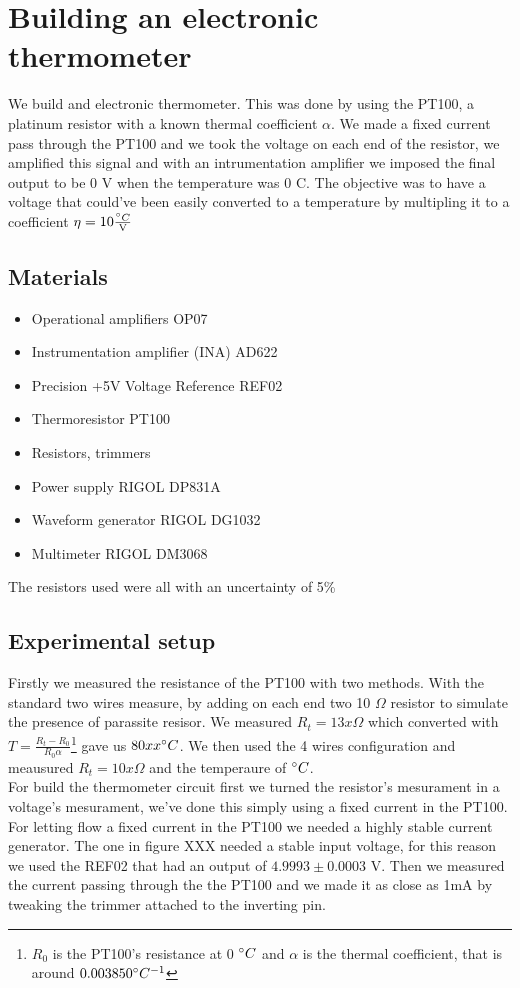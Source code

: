 \chapter{Building an electronic thermometer}
We build and electronic thermometer. This was done by using the PT100, a platinum resistor with a known thermal coefficient $\alpha$. We made a fixed current pass through the PT100 and we took the voltage on each end of the resistor, we amplified this signal and with an intrumentation amplifier we imposed the final output to be 0 V when the temperature was 0 \degree C. The objective was to have a voltage that could've been easily converted to a temperature by multipling it to a coefficient $\eta = 10 \frac{\degree C}{\text{V}}$


\section{Materials}
\begin{itemize}
\item Operational amplifiers OP07
\item Instrumentation amplifier (INA) AD622
\item Precision +5V Voltage Reference REF02
\item Thermoresistor PT100
\item Resistors, trimmers
\item Power supply RIGOL DP831A
\item Waveform generator RIGOL DG1032
\item Multimeter RIGOL DM3068
\end{itemize}
The resistors used were all with an uncertainty of 5\%
\section{Experimental setup}
Firstly we measured the resistance of the PT100 with two methods. With the standard two wires measure, by adding on each end two 10 $\Omega$ resistor to simulate the presence of parassite resisor. We measured $R_t = 13x \Omega$ which converted with $T = \frac{R_t - R_0}{R_0 \alpha}$\footnote{ $R_0$ is the PT100's resistance at 0 $\degree C$ and $\alpha$ is the thermal coefficient, that is around $0.003850 \degree C^{-1}$  }
gave us $80 xx \degree C$. We then used the 4 wires configuration and meausured $R_t = 10x \Omega$ and the temperaure of  $\degree C$.\\

For build the thermometer circuit first we turned the resistor's mesurament in a voltage's mesurament, we've done this simply using a fixed current in the PT100.
For letting flow a fixed current in the PT100 we needed a highly stable current generator. The one in figure XXX needed a stable input voltage, for this  reason we used the REF02 that had an output of $4.9993 \pm 0.0003$ V. Then we measured the current passing through the the PT100 and we made it as close as 1mA by tweaking the trimmer attached to the inverting pin.\\

